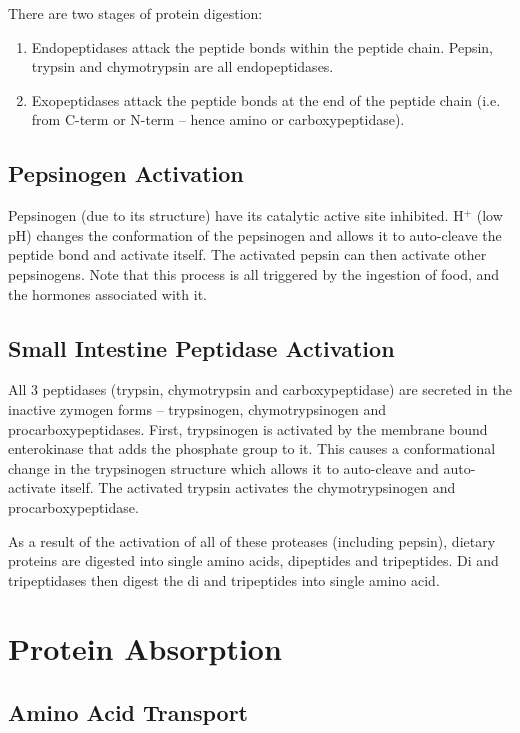 \documentclass[a4paper, 12pt]{report}
\begin{document}
There are two stages of protein digestion:
\begin{enumerate}
\item Endopeptidases attack the peptide bonds within the peptide chain. Pepsin, trypsin and chymotrypsin are all endopeptidases.
\item Exopeptidases attack the peptide bonds at the end of the peptide chain (i.e. from C-term or N-term -- hence amino or carboxypeptidase).
\end{enumerate}

\subsection{Pepsinogen Activation}

Pepsinogen (due to its structure) have its catalytic active site inhibited.
H$^+$ (low pH) changes the conformation of the pepsinogen and allows it to auto-cleave the peptide bond and activate itself.
The activated pepsin can then activate other pepsinogens.
Note that this process is all triggered by the ingestion of food, and the hormones associated with it.

\subsection{Small Intestine Peptidase Activation}

All 3 peptidases (trypsin, chymotrypsin and carboxypeptidase) are secreted in the inactive zymogen forms -- trypsinogen, chymotrypsinogen and procarboxypeptidases.
First, trypsinogen is activated by the membrane bound enterokinase that adds the phosphate group to it.
This causes a conformational change in the trypsinogen structure which allows it to auto-cleave and auto-activate itself.
The activated trypsin activates the chymotrypsinogen and procarboxypeptidase.

As a result of the activation of all of these proteases (including pepsin), dietary proteins are digested into single amino acids, dipeptides and tripeptides.
Di and tripeptidases then digest the di and tripeptides into single amino acid.

\section{Protein Absorption}

\subsection{Amino Acid Transport}
\end{document}
